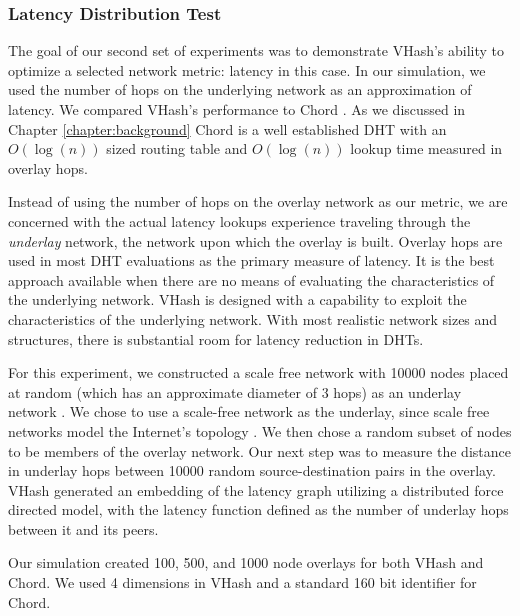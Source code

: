 \subsubsection{Latency Distribution Test}
The goal of our second set of experiments was to demonstrate VHash's ability to optimize a selected network metric: latency in this case.
In our simulation, we used the number of hops on the underlying network as an approximation of latency.
We compared VHash's performance to Chord \cite{chord}.
As we discussed in Chapter \ref{chapter:background} Chord is a well established DHT with an $O(\log(n))$ sized routing table and $O(\log(n))$ lookup time measured in overlay hops.

Instead of using the number of hops on the overlay network as our metric, we are concerned with the actual latency lookups experience traveling through the \emph{underlay} network, the network upon which the overlay is built.
Overlay hops are used in most DHT evaluations as the primary measure of latency.
It is the best approach available when there are no means of evaluating the characteristics of the underlying network.
VHash is designed with a capability to exploit the characteristics of the underlying network.
With most realistic network sizes and structures, there is substantial room for latency reduction in DHTs.

For this experiment, we constructed a scale free network with 10000 nodes placed at random (which has an approximate diameter of 3 hops) as an underlay network \cite{cohen2000resilience} \cite{pastor2001epidemic} \cite{hagberg2004}.
We chose to use a scale-free network as the underlay, since  scale free networks model the Internet's topology \cite{cohen2000resilience} \cite{pastor2001epidemic}.
We then chose a random subset of nodes to be members of the overlay network.
Our next step was to measure the distance in underlay hops between 10000 random source-destination pairs in the overlay.
VHash generated an embedding of the latency graph utilizing a distributed force directed model, with the latency function defined as the number of underlay hops between it and its peers.

Our simulation created 100, 500, and 1000 node overlays for both VHash and Chord.
We used 4 dimensions in VHash and a standard 160 bit identifier for Chord.




